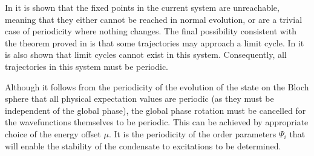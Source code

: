 In  it is shown that the fixed points in the current system are unreachable, meaning that they either cannot be reached in normal evolution, or are a trivial case of periodicity where nothing changes.  The final possibility consistent with the theorem proved in \citep{Schwartz:1963} is that some trajectories may approach a limit cycle.  In  it is also shown that limit cycles cannot exist in this system.  Consequently, all trajectories in this system must be periodic.

Although it follows from the periodicity of the evolution of the state on the Bloch sphere that all physical expectation values are periodic (as they must be independent of the global phase), the global phase rotation must be cancelled for the wavefunctions themselves to be periodic. This can be achieved by appropriate choice of the energy offset $\mu$. It is the periodicity of the order parameters $\Psi_i$ that will enable the stability of the condensate to excitations to be determined.

